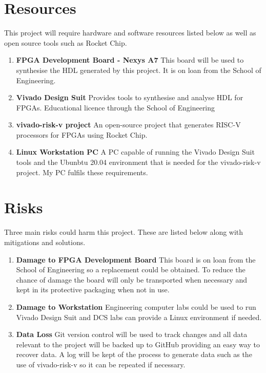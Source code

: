 \documentclass[a4paper,fleqn,12pt]{article}
\begin{document}
	\section{Resources}
	This project will require hardware and software resources listed below as well as open source tools such as Rocket Chip.
	\begin{enumerate}
		\item \textbf{FPGA Development Board - Nexys A7} \newline
		This board will be used to synthesise the HDL generated by this project. It is on loan from the School of Engineering.
		\item \textbf{Vivado Design Suit} \newline
		Provides tools to synthesise and analyse HDL for FPGAs. Educational licence through the School of Engineering
		\item \textbf{vivado-risk-v project} \citep{vivado-risk-v} \newline
		An open-source project that generates RISC-V processors for FPGAs using Rocket Chip.
		\item \textbf{Linux Workstation PC} \newline
		A PC capable of running the Vivado Design Suit tools and the Ubunbtu 20.04 environment that is needed for the vivado-risk-v project. My PC fulfils these requirements.
	\end{enumerate}
	
	\section{Risks}
	Three main risks could harm this project. These are listed below along with mitigations and solutions.
	\begin{enumerate}
		\item \textbf{Damage to FPGA Development Board} \newline
		This board is on loan from the School of Engineering so a replacement could be obtained. To reduce the chance of damage the board will only be transported when necessary and kept in its protective packaging when not in use.
		\item \textbf{Damage to Workstation} \newline
		Engineering computer labs could be used to run Vivado Design Suit and DCS labs can provide a Linux environment if needed.
		\item \textbf{Data Loss} \newline
		Git version control will be used to track changes and all data relevant to the project will be backed up to GitHub providing an easy way to recover data. A log will be kept of the process to generate data such as the use of vivado-risk-v so it can be repeated if necessary.
	\end{enumerate}
	
\end{document}
